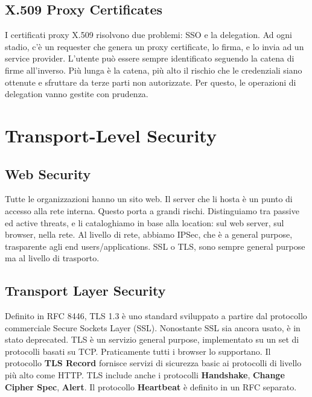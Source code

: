 \documentclass[11pt]{article}
\begin{document}
\subsection{X.509 Proxy Certificates}
I certificati proxy X.509 risolvono due problemi: SSO e la delegation. Ad ogni stadio, c'è un requester che genera un proxy certificate, lo firma, e lo invia ad un service provider. L'utente può essere sempre identificato seguendo la catena di firme all'inverso. Più lunga è la catena, più alto il rischio che le credenziali siano ottenute e sfruttare da terze parti non autorizzate. Per questo, le operazioni di delegation vanno gestite con prudenza.

\section{Transport-Level Security}
\subsection{Web Security}
Tutte le organizzazioni hanno un sito web. Il server che li hosta è un punto di accesso alla rete interna. Questo porta a grandi rischi. Distinguiamo tra passive ed active threats, e li cataloghiamo in base alla location: sul web server, sul browser, nella rete. 
Al livello di rete, abbiamo IPSec, che è a general purpose, trasparente agli end users/applications. SSL o TLS, sono sempre general purpose ma al livello di trasporto.
\subsection{Transport Layer Security}
Definito in RFC 8446, TLS 1.3 è uno standard sviluppato a partire dal protocollo commerciale Secure Sockets Layer (SSL). Nonostante SSL sia ancora usato, è in stato deprecated. TLS è un servizio general purpose, implementato su un set di protocolli basati su TCP. Praticamente tutti i browser lo supportano. Il protocollo \textbf{TLS Record} fornisce servizi di sicurezza basic ai protocolli di livello più alto come HTTP. TLS include anche i protocolli \textbf{Handshake}, \textbf{Change Cipher Spec}, \textbf{Alert}. Il protocollo \textbf{Heartbeat} è definito in un RFC separato. 
\end{document}
